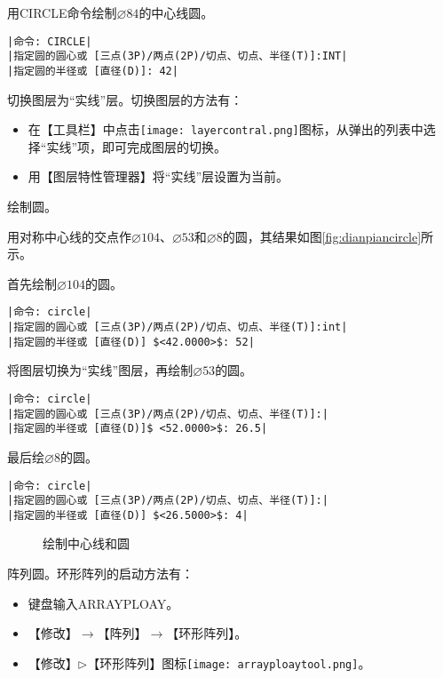 \begin{procedure}
用CIRCLE命令绘制$\diameter 84$的中心线圆。
\begin{lstlisting}
|命令: CIRCLE|
|指定圆的圆心或 [三点(3P)/两点(2P)/切点、切点、半径(T)]:INT|
|指定圆的半径或 [直径(D)]: 42|
\end{lstlisting}
\item 切换图层为“实线”层。切换图层的方法有：
\begin{itemize}
\item 在【工具栏】中点击\texttt{[image: layercontral.png]}图标，从弹出的列表中选择“实线”项，即可完成图层的切换。
\item 用【图层特性管理器】将“实线”层设置为当前。
\end{itemize}
\item 绘制圆。

用对称中心线的交点作$\diameter 104$、$\diameter 53$和$\diameter 8$的圆，其结果如图\ref{fig:dianpiancircle}所示。

首先绘制$\diameter 104$的圆。
\begin{lstlisting}
|命令: circle|
|指定圆的圆心或 [三点(3P)/两点(2P)/切点、切点、半径(T)]:int|
|指定圆的半径或 [直径(D)] $<42.0000>$: 52|
\end{lstlisting}
将图层切换为“实线”图层，再绘制$\diameter 53$的圆。
\begin{lstlisting}
|命令: circle|
|指定圆的圆心或 [三点(3P)/两点(2P)/切点、切点、半径(T)]:|
|指定圆的半径或 [直径(D)]$ <52.0000>$: 26.5|
\end{lstlisting}
最后绘$\diameter 8$的圆。
\begin{lstlisting}
|命令: circle|
|指定圆的圆心或 [三点(3P)/两点(2P)/切点、切点、半径(T)]:|
|指定圆的半径或 [直径(D)] $<26.5000>$: 4|
\end{lstlisting}

\begin{figure}[htbp]
\centering
{}\hspace{20pt}
\caption{绘制中心线和圆}
\end{figure}
\item 阵列圆。环形阵列的启动方法有：
\begin{itemize}
\item 键盘输入ARRAYPLOAY。
\item 【修改】$\rightarrow$【阵列】$\rightarrow$【环形阵列】。
\item 【修改】$\triangleright$【环形阵列】图标\texttt{[image: arrayploaytool.png]}。
\end{itemize}


\end{procedure}
